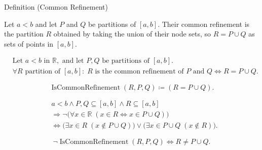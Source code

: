 \begin{definitionbox}{Definition (Common Refinement)}
\begin{definition}
\label{def:common-refinement}
Let $a<b$ and let $P$ and $Q$ be partitions of $[a,b]$. Their common refinement is the partition $R$ obtained by taking the union of their node sets, so $R = P \cup Q$ as sets of points in $[a,b]$.
\end{definition}
\end{definitionbox}

\begin{remark*}
\[
\begin{aligned}
&\text{Let } a<b \text{ in } \mathbb{R}, \text{ and let } P,Q \text{ be partitions of } [a,b].\\
&\forall R \text{ partition of } [a,b]:\;
R \text{ is the common refinement of } P \text{ and } Q
\Longleftrightarrow
R = P \cup Q.
\end{aligned}
\]
\end{remark*}

\begin{remark*}
\[
\operatorname{IsCommonRefinement}(R,P,Q) \coloneqq (R = P \cup Q).
\]
\end{remark*}

\begin{remark*}
\[
\begin{aligned}
&a<b\land P,Q\subseteq [a,b]\land R\subseteq [a,b]\\
&\Longrightarrow
\neg\bigl(\forall x\in\mathbb{R}\;(x\in R\Longleftrightarrow x\in P\cup Q)\bigr)\\
&\Longleftrightarrow
\bigl(\exists x\in R\;(x\notin P\cup Q)\bigr)
\lor
\bigl(\exists x\in P\cup Q\;(x\notin R)\bigr).
\end{aligned}
\]
\end{remark*}

\begin{remark*}
\[
\neg \operatorname{IsCommonRefinement}(R,P,Q) \Longleftrightarrow R \ne P \cup Q.
\]
\end{remark*}

